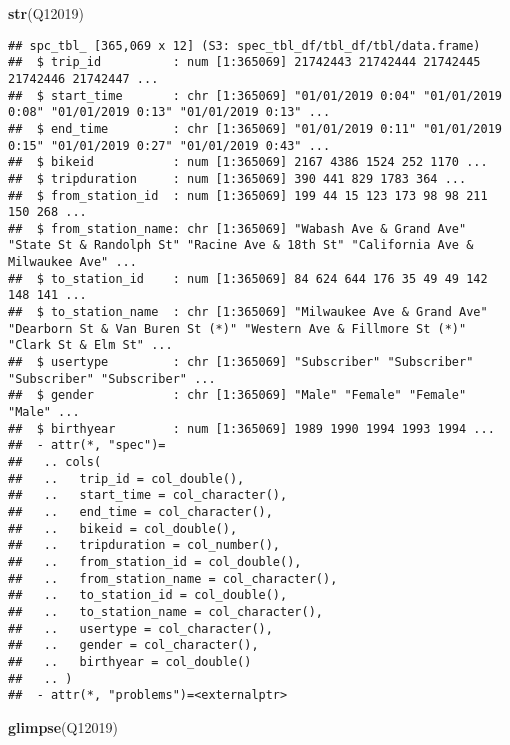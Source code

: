 \documentclass[
]{article}
\newenvironment{Shaded}{\begin{snugshade}}{\end{snugshade}}
\newcommand{\FunctionTok}[1]{\textcolor[rgb]{0.13,0.29,0.53}{\textbf{#1}}}
\newcommand{\NormalTok}[1]{#1}
\begin{document}
\begin{Shaded}
\begin{Highlighting}[]
\FunctionTok{str}\NormalTok{(Q12019)}
\end{Highlighting}
\end{Shaded}

\begin{verbatim}
## spc_tbl_ [365,069 x 12] (S3: spec_tbl_df/tbl_df/tbl/data.frame)
##  $ trip_id          : num [1:365069] 21742443 21742444 21742445 21742446 21742447 ...
##  $ start_time       : chr [1:365069] "01/01/2019 0:04" "01/01/2019 0:08" "01/01/2019 0:13" "01/01/2019 0:13" ...
##  $ end_time         : chr [1:365069] "01/01/2019 0:11" "01/01/2019 0:15" "01/01/2019 0:27" "01/01/2019 0:43" ...
##  $ bikeid           : num [1:365069] 2167 4386 1524 252 1170 ...
##  $ tripduration     : num [1:365069] 390 441 829 1783 364 ...
##  $ from_station_id  : num [1:365069] 199 44 15 123 173 98 98 211 150 268 ...
##  $ from_station_name: chr [1:365069] "Wabash Ave & Grand Ave" "State St & Randolph St" "Racine Ave & 18th St" "California Ave & Milwaukee Ave" ...
##  $ to_station_id    : num [1:365069] 84 624 644 176 35 49 49 142 148 141 ...
##  $ to_station_name  : chr [1:365069] "Milwaukee Ave & Grand Ave" "Dearborn St & Van Buren St (*)" "Western Ave & Fillmore St (*)" "Clark St & Elm St" ...
##  $ usertype         : chr [1:365069] "Subscriber" "Subscriber" "Subscriber" "Subscriber" ...
##  $ gender           : chr [1:365069] "Male" "Female" "Female" "Male" ...
##  $ birthyear        : num [1:365069] 1989 1990 1994 1993 1994 ...
##  - attr(*, "spec")=
##   .. cols(
##   ..   trip_id = col_double(),
##   ..   start_time = col_character(),
##   ..   end_time = col_character(),
##   ..   bikeid = col_double(),
##   ..   tripduration = col_number(),
##   ..   from_station_id = col_double(),
##   ..   from_station_name = col_character(),
##   ..   to_station_id = col_double(),
##   ..   to_station_name = col_character(),
##   ..   usertype = col_character(),
##   ..   gender = col_character(),
##   ..   birthyear = col_double()
##   .. )
##  - attr(*, "problems")=<externalptr>
\end{verbatim}

\begin{Shaded}
\begin{Highlighting}[]
\FunctionTok{glimpse}\NormalTok{(Q12019)}
\end{Highlighting}
\end{Shaded}
\end{document}
